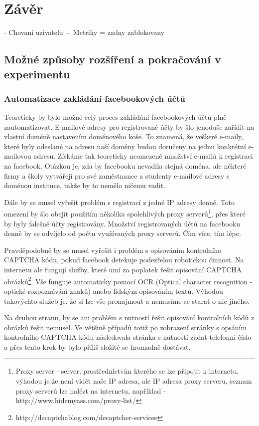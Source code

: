 \documentclass[thesis=M,czech]{FITthesis}[2013/05/10]
\begin{document}
\chapter{Z{\' a}v{\v e}r}

- Chovani uzivatelu + Metriky
= zadny zablokovany

\section{Možné způsoby rozšíření a pokračování v experimentu}

\subsection{Automatizace zakládání facebookových účtů}
Teoreticky by bylo možné celý proces zakládání facebookových účtů plně zautomatizovat. E-mailové adresy pro registrované účty by šlo jenoduše zařídit na vlastní doméně nastavením doménového koše. To znamená, že veškeré e-maily, které byly odeslané na adresu naší domény budou doručeny na jednu konkrétní e-mailovou adresu. Získáme tak teoreticky neomezené množství e-mailů k registraci na facebook. Otázkou je, zda by facebooku nevadila stejná doména, ale některé firmy a školy vytvářejí pro své zaměstnance a studenty e-mailové adresy s doménou instituce, takže by to nemělo ničemu vadit.

Dále by se musel vyřešit problém s registrací z jedné IP adresy denně. Toto omezení by šlo obejít použitím několika spolehlivých proxy serverů\footnote{Proxy server - server, prostřednictvím kterého se lze připojit k internetu, výhodou je že není vidět naše IP adresa, ale IP adresa proxy serveru, seznam proxy serverů lze nalézt na internetu, například - http://www.hidemyass.com/proxy-list/}, přes které by byly falešné účty registrovány. Množství registrovaných účtů na facebooku denně by se odvíjelo od počtu využívaných proxy serverů. Čím více, tím lépe.

Pravděpodobně by se musel vyřešit i problém s opisováním kontrolního CAPTCHA kódu, pokud facebook detekuje podezřelou robotickou činnost. Na internetu ale fungují služby, které umí za poplatek řešit opisování CAPTCHA obrázků\footnote{http://decaptchablog.com/decaptcher-services}. Vše funguje automaticky pomocí OCR (Optical character recognition - optické rozpoznávání znaků) anebo lidským opisováním textů. Výhodou takovýchto služeb je, že si lze vše pronajmout a nemusíme se starat o nic jiného. 

Na druhou stranu, by se ani problém s nutností řešit opisování kontrolních kódů z obrázků řešit nemusel. Ve většině případů totiž po zobrazení stránky s opsáním kontrolního CAPTCHA kódu následovala stránka s nutností zadat telefonní číslo a přes tento krok by bylo příliš složité se hromadně dostávat.
\end{document}
